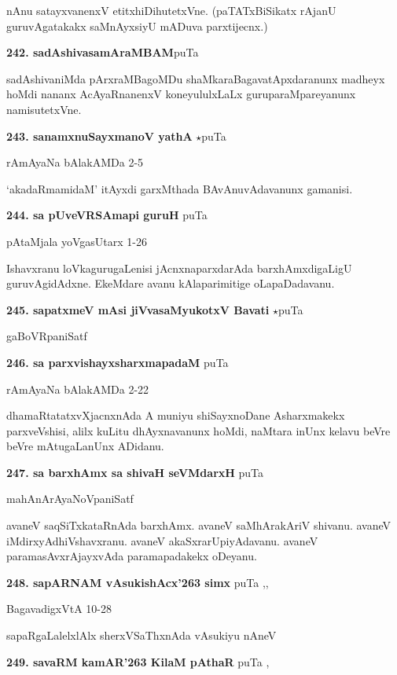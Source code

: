 nAnu satayxvanenxV etitxhiDihutetxVne. (paTATxBiSikatx rAjanU guruvAgatakakx saMnAyxsiyU mADuva parxtijecnx.)

\medskip
\noindent\textbf{242. sadAshivasamAraMBAM}\hfill puTa \pageref{48c}

sadAshivaniMda pArxraMBagoMDu shaMkaraBagavatApxdaranunx madheyx hoMdi nananx AcAyaRnanenxV koneyululxLaLx guruparaMpareyanunx namisutetxVne.

\medskip
\noindent\textbf{243. sanamxnuSayxmanoV yathA} $\star$\hfill puTa \pageref{197a}

\hfill rAmAyaNa bAlakAMDa 2-5

`akadaRmamidaM' itAyxdi garxMthada BAvAnuvAdavanunx gamanisi.

\medskip
\noindent\textbf{244. sa pUveVRSAmapi guruH} \hfill puTa \pageref{129}

\hfill pAtaMjala yoVgasUtarx 1-26

Ishavxranu loVkagurugaLenisi jAcnxnaparxdarAda barxhAmxdigaLigU guruvAgidAdxne. EkeMdare avanu kAlaparimitige oLapaDadavanu.

\medskip
\noindent\textbf{245. sapatxmeV mAsi jiVvasaMyukotxV Bavati} $\star$\hfill puTa \pageref{85a}

\hfill gaBoVRpaniSatf

\medskip
\noindent\textbf{246. sa parxvishayxsharxmapadaM} \hfill puTa \pageref{201b}

\hfill rAmAyaNa bAlakAMDa 2-22

dhamaRtatatxvXjacnxnAda A muniyu shiSayxnoDane Asharxmakekx parxveVshisi, alilx kuLitu dhAyxnavanunx hoMdi, naMtara inUnx kelavu beVre beVre mAtugaLanUnx ADidanu.

\medskip
\noindent\textbf{247. sa barxhAmx sa shivaH seVMdarxH} \hfill puTa \pageref{249c}

\hfill mahAnArAyaNoVpaniSatf

avaneV saqSiTxkataRnAda barxhAmx. avaneV saMhArakAriV shivanu. avaneV iMdirxyAdhiVshavxranu. avaneV akaSxrarUpiyAdavanu. avaneV paramasAvxrAjayxvAda paramapadakekx oDeyanu. 

\medskip
\noindent\textbf{248. sapARNAM vAsukishAcx\char'263 simx} \hfill puTa \pageref{93b},\pageref{95a},\pageref{98b}

\hfill BagavadigxVtA 10-28

sapaRgaLalelxlAlx sherxVSaThxnAda vAsukiyu nAneV

\medskip
\noindent\textbf{249. savaRM kamAR\char'263 KilaM pAthaR} \hfill puTa \pageref{98c},\pageref{78}

